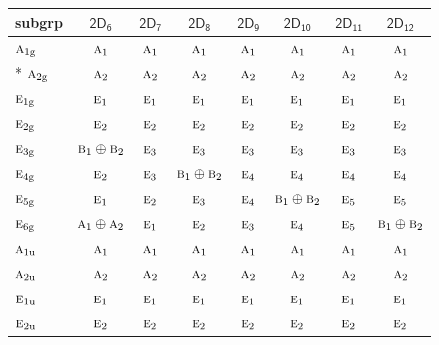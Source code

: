 \documentclass[10pt,a4paper]{article}
\numberwithin{equation}{section}
\newcommand{\grp}[1]{\mathsf{#1}}
\newcommand{\irr}[1]{\text{\normalfont\scshape #1}}
\newcommand{\ptag}[1]{\mathrm{#1}}
\begin{document}
{\small\begin{longtable}{@{}lccccccc@{}}\toprule
subgrp & \href{2D6.pdf}{$\grp{2D_{6}}$} & \href{2D7.pdf}{$\grp{2D_{7}}$} & \href{2D8.pdf}{$\grp{2D_{8}}$} & \href{2D9.pdf}{$\grp{2D_{9}}$} & \href{2D10.pdf}{$\grp{2D_{10}}$} & \href{2D11.pdf}{$\grp{2D_{11}}$} & \href{2D12.pdf}{$\grp{2D_{12}}$}\\\midrule\endhead
\bottomrule\endfoot\endlastfoot
$\irr{a}_{1\ptag{g}}$ & $\irr{a}_{1}$ & $\irr{a}_{1}$ & $\irr{a}_{1}$ & $\irr{a}_{1}$ & $\irr{a}_{1}$ & $\irr{a}_{1}$ & $\irr{a}_{1}$\\*
$\irr{a}_{2\ptag{g}}$ & $\irr{a}_{2}$ & $\irr{a}_{2}$ & $\irr{a}_{2}$ & $\irr{a}_{2}$ & $\irr{a}_{2}$ & $\irr{a}_{2}$ & $\irr{a}_{2}$\\
$\irr{e}_{1\ptag{g}}$ & $\irr{e}_{1}$ & $\irr{e}_{1}$ & $\irr{e}_{1}$ & $\irr{e}_{1}$ & $\irr{e}_{1}$ & $\irr{e}_{1}$ & $\irr{e}_{1}$\\
$\irr{e}_{2\ptag{g}}$ & $\irr{e}_{2}$ & $\irr{e}_{2}$ & $\irr{e}_{2}$ & $\irr{e}_{2}$ & $\irr{e}_{2}$ & $\irr{e}_{2}$ & $\irr{e}_{2}$\\
$\irr{e}_{3\ptag{g}}$ & $\irr{b}_{1}\oplus \irr{b}_{2}$ & $\irr{e}_{3}$ & $\irr{e}_{3}$ & $\irr{e}_{3}$ & $\irr{e}_{3}$ & $\irr{e}_{3}$ & $\irr{e}_{3}$\\
$\irr{e}_{4\ptag{g}}$ & $\irr{e}_{2}$ & $\irr{e}_{3}$ & $\irr{b}_{1}\oplus \irr{b}_{2}$ & $\irr{e}_{4}$ & $\irr{e}_{4}$ & $\irr{e}_{4}$ & $\irr{e}_{4}$\\
$\irr{e}_{5\ptag{g}}$ & $\irr{e}_{1}$ & $\irr{e}_{2}$ & $\irr{e}_{3}$ & $\irr{e}_{4}$ & $\irr{b}_{1}\oplus \irr{b}_{2}$ & $\irr{e}_{5}$ & $\irr{e}_{5}$\\
$\irr{e}_{6\ptag{g}}$ & $\irr{a}_{1}\oplus \irr{a}_{2}$ & $\irr{e}_{1}$ & $\irr{e}_{2}$ & $\irr{e}_{3}$ & $\irr{e}_{4}$ & $\irr{e}_{5}$ & $\irr{b}_{1}\oplus \irr{b}_{2}$\\
$\irr{a}_{1\ptag{u}}$ & $\irr{a}_{1}$ & $\irr{a}_{1}$ & $\irr{a}_{1}$ & $\irr{a}_{1}$ & $\irr{a}_{1}$ & $\irr{a}_{1}$ & $\irr{a}_{1}$\\
$\irr{a}_{2\ptag{u}}$ & $\irr{a}_{2}$ & $\irr{a}_{2}$ & $\irr{a}_{2}$ & $\irr{a}_{2}$ & $\irr{a}_{2}$ & $\irr{a}_{2}$ & $\irr{a}_{2}$\\
$\irr{e}_{1\ptag{u}}$ & $\irr{e}_{1}$ & $\irr{e}_{1}$ & $\irr{e}_{1}$ & $\irr{e}_{1}$ & $\irr{e}_{1}$ & $\irr{e}_{1}$ & $\irr{e}_{1}$\\
$\irr{e}_{2\ptag{u}}$ & $\irr{e}_{2}$ & $\irr{e}_{2}$ & $\irr{e}_{2}$ & $\irr{e}_{2}$ & $\irr{e}_{2}$ & $\irr{e}_{2}$ & $\irr{e}_{2}$\\

\end{longtable}}
\end{document}
